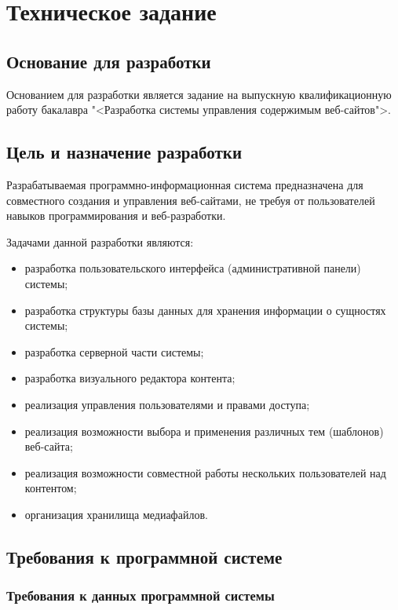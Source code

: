 \section{Техническое задание}
\subsection{Основание для разработки}

Основанием для разработки является задание на выпускную квалификационную работу бакалавра "<Разработка системы управления содержимым веб-сайтов">.

\subsection{Цель и назначение разработки}

Разрабатываемая программно-информационная система предназначена для совместного создания и управления веб-сайтами, не требуя от пользователей навыков программирования и веб-разработки. 

Задачами данной разработки являются:
\begin{itemize}
	\item разработка пользовательского интерфейса (административной панели) системы;
	\item разработка структуры базы данных для хранения информации о сущностях системы;
	\item разработка серверной части системы;
	\item разработка визуального редактора контента;
	\item реализация управления пользователями и правами доступа;
	\item реализация возможности выбора и применения различных тем (шаблонов) веб-сайта;
	\item реализация возможности совместной работы нескольких пользователей над контентом;
	\item организация хранилища медиафайлов.
\end{itemize}

\subsection{Требования к программной системе}
\subsubsection{Требования к данных программной системы}

